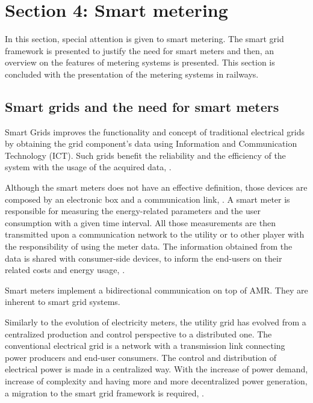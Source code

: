


\section{Section 4: Smart metering}

In this section, special attention is given to smart metering. The smart grid framework is presented to justify the need for smart meters and then, an overview on the features of metering systems is presented.
This section is concluded with the presentation of the metering systems in railways.






\subsection{Smart grids and the need for smart meters}

Smart Grids improves the functionality and concept of traditional electrical grids by obtaining the grid component's data using Information and Communication Technology (ICT). Such grids benefit the reliability and the efficiency of the system with the usage of the acquired data, \cite{Mohassel2014}.

Although the smart meters does not have an effective definition, those devices are composed by an electronic box and a communication link, \cite{Seppo2012}. A smart meter is responsible for measuring the energy-related parameters and the user consumption with a given time interval. All those measurements are then transmitted upon a communication network to the utility or to other player with the responsibility of using the meter data. The information obtained from the data is shared with consumer-side devices, to inform the end-users on their related costs and energy usage, \cite{Siano2014}.

Smart meters implement a bidirectional communication on top of AMR. They are inherent to smart grid systems. 

Similarly to the evolution of electricity meters, the utility grid has evolved from a centralized production and control perspective to a distributed one. The conventional electrical grid is a network with a transmission link connecting power producers and end-user consumers. The control and distribution of electrical power is made in a centralized way. With the increase of power demand, increase of complexity and having more and more decentralized power generation, a migration to the smart grid framework is required, \cite{Reddy2014}.

